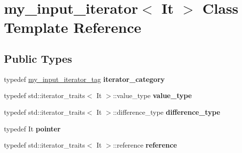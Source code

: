 \hypertarget{classmy__input__iterator}{}\section{my\+\_\+input\+\_\+iterator$<$ It $>$ Class Template Reference}
\label{classmy__input__iterator}
\subsection*{Public Types}
\begin{DoxyCompactItemize}
\item 
\mbox{\label{classmy__input__iterator_ab5ae5b9027aaf3fb35e9f3c69eccfc6b}} 
typedef \mbox{\hyperlink{classmy__input__iterator__tag}{my\+\_\+input\+\_\+iterator\+\_\+tag}} {\bfseries iterator\+\_\+category}
\item 
\mbox{\label{classmy__input__iterator_a8f15fd14c7471fbc0361f95efd68b2e2}} 
typedef std\+::iterator\+\_\+traits$<$ It $>$\+::value\+\_\+type {\bfseries value\+\_\+type}
\item 
\mbox{\label{classmy__input__iterator_a1d0ee02453c2449dd69d36915729b918}} 
typedef std\+::iterator\+\_\+traits$<$ It $>$\+::difference\+\_\+type {\bfseries difference\+\_\+type}
\item 
\mbox{\label{classmy__input__iterator_ac388c942fc3e299dbb9b7cae7a367586}} 
typedef It {\bfseries pointer}
\item 
\mbox{\label{classmy__input__iterator_a90747e226bd3a8a63832dce676f29c0c}} 
typedef std\+::iterator\+\_\+traits$<$ It $>$\+::reference {\bfseries reference}
\end{DoxyCompactItemize}
